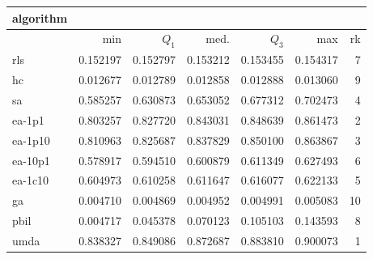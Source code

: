 \begin{tabular}{@{}l*{5}{>{{}}N{1}{3}}>{{}}N{2}{0}@{}}
\toprule
{algorithm} &  \\
\midrule
& {min} & {$Q_1$} & {med.} & {$Q_3$} & {max} & {rk}\\
\midrule
rls & 0.152197 & 0.152797 & 0.153212 & 0.153455 & 0.154317 & 7\\
hc & 0.012677 & 0.012789 & 0.012858 & 0.012888 & 0.013060 & 9\\
sa & 0.585257 & 0.630873 & 0.653052 & 0.677312 & 0.702473 & 4\\
ea-1p1 & 0.803257 & 0.827720 & 0.843031 & 0.848639 & 0.861473 & 2\\
ea-1p10 & 0.810963 & 0.825687 & 0.837829 & 0.850100 & 0.863867 & 3\\
ea-10p1 & 0.578917 & 0.594510 & 0.600879 & 0.611349 & 0.627493 & 6\\
ea-1c10 & 0.604973 & 0.610258 & 0.611647 & 0.616077 & 0.622133 & 5\\
ga & 0.004710 & 0.004869 & 0.004952 & 0.004991 & 0.005083 & 10\\
pbil & 0.004717 & 0.045378 & 0.070123 & 0.105103 & 0.143593 & 8\\
umda & {\color{blue}} 0.838327 & {\color{blue}} 0.849086 & {\color{blue}} 0.872687 & {\color{blue}} 0.883810 & {\color{blue}} 0.900073 & 1\\
\bottomrule
\end{tabular}
